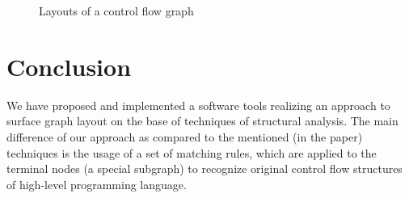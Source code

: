 \documentclass[conference]{IEEEtran}
\begin{document}
\begin{figure}[b]
\begin{minipage}[b]{0.49\linewidth}
	\end{minipage}
	\caption{Layouts of a control flow graph}
	\label{fig:image1}
\end{figure}


\section{Conclusion}
We have proposed and implemented a software tools realizing an approach to surface graph layout on the base of techniques of structural analysis.  The main difference of our approach as compared to the mentioned (in the paper) techniques is the usage of a set of matching rules, which are applied to the terminal nodes (a special subgraph) to recognize original control flow structures of high-level programming language.
\end{document}
